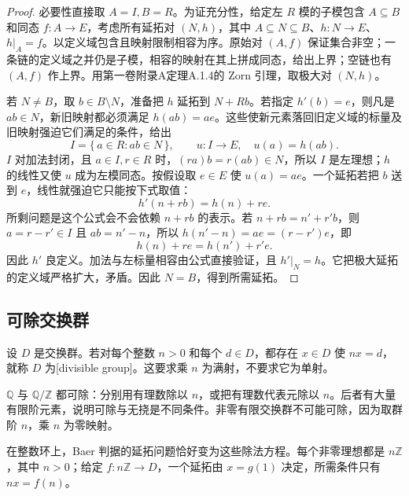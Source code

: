 \begin{proof}
	必要性直接取 \(A=I,B=R\)。为证充分性，给定左 \(R\) 模的子模包含 \(A\subseteq B\) 和同态 \(f:A\to E\)，考虑所有延拓对 \((N,h)\)，其中 \(A\subseteq N\subseteq B\)、\(h:N\to E\)、\(h|_A=f\)。以定义域包含且映射限制相容为序。原始对 \((A,f)\) 保证集合非空；一条链的定义域之并仍是子模，相容的映射在其上拼成同态，给出上界；空链也有 \((A,f)\) 作上界。用第一卷附录A定理A.1.4的 Zorn 引理，取极大对 \((N,h)\)。

	若 \(N\ne B\)，取 \(b\in B\setminus N\)，准备把 \(h\) 延拓到 \(N+Rb\)。若指定 \(h'(b)=e\)，则凡是 \(ab\in N\)，新旧映射都必须满足 \(h(ab)=ae\)。这些使新元素落回旧定义域的标量及旧映射强迫它们满足的条件，给出
	\[
		I=\{\,a\in R:ab\in N\,\},\qquad u:I\longrightarrow E,\quad u(a)=h(ab).
	\]
	\(I\) 对加法封闭，且 \(a\in I,r\in R\) 时，\((ra)b=r(ab)\in N\)，所以 \(I\) 是左理想；\(h\) 的线性又使 \(u\) 成为左模同态。按假设取 \(e\in E\) 使 \(u(a)=ae\)。一个延拓若把 \(b\) 送到 \(e\)，线性就强迫它只能按下式取值：
	\[
		h'(n+rb)=h(n)+re.
	\]
	所剩问题是这个公式会不会依赖 \(n+rb\) 的表示。若 \(n+rb=n'+r'b\)，则 \(a=r-r'\in I\) 且 \(ab=n'-n\)，所以 \(h(n'-n)=ae=(r-r')e\)，即
	\[
		h(n)+re=h(n')+r'e.
	\]
	因此 \(h'\) 良定义。加法与左标量相容由公式直接验证，且 \(h'|_N=h\)。它把极大延拓的定义域严格扩大，矛盾。因此 \(N=B\)，得到所需延拓。
\end{proof}

\subsection{可除交换群}
\label{b2:subsec:0702:02}

\begin{definition}\label{b2:def:divisible-group}
	设 \(D\) 是交换群。若对每个整数 \(n>0\) 和每个 \(d\in D\)，都存在 \(x\in D\) 使 \(nx=d\)，就称 \(D\) 为[divisible group]。这要求乘 \(n\) 为满射，不要求它为单射。
\end{definition}

\(\mathbb Q\) 与 \(\mathbb Q/\mathbb Z\) 都可除：分别用有理数除以 \(n\)，或把有理数代表元除以 \(n\)。后者有大量有限阶元素，说明可除与无挠是不同条件。非零有限交换群不可能可除，因为取群阶 \(n\)，乘 \(n\) 为零映射。

\ProseParagraphBreak
在整数环上，Baer 判据的延拓问题恰好变为这些除法方程。每个非零理想都是 \(n\mathbb Z\)，其中 \(n>0\)；给定 \(f:n\mathbb Z\to D\)，一个延拓由 \(x=g(1)\) 决定，所需条件只有 \(nx=f(n)\)。

